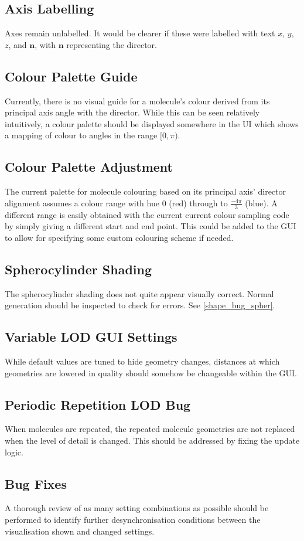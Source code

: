 \subsection{Axis Labelling}
Axes remain unlabelled. It would be clearer if these were labelled with text $x$, $y$, $z$, and $\mathbf{n}$, with $\mathbf{n}$ representing the director.

\subsection{Colour Palette Guide}
Currently, there is no visual guide for a molecule's colour derived from its principal axis angle with the director. While this can be seen relatively intuitively, a colour palette should be displayed somewhere in the UI which shows a mapping of colour to angles in the range $[0, \pi)$.

\subsection{Colour Palette Adjustment}
The current palette for molecule colouring based on its principal axis' director alignment assumes a colour range with hue $0$ (red) through to $\frac{-4\pi}{3}$ (blue). A different range is easily obtained with the current current colour sampling code by simply giving a different start and end point. This could be added to the GUI to allow for specifying some custom colouring scheme if needed.

\subsection{Spherocylinder Shading}
The spherocylinder shading does not quite appear visually correct. Normal generation should be inspected to check for errors. See \cref{shape_bug_spher}.

\subsection{Variable LOD GUI Settings}
While default values are tuned to hide geometry changes, distances at which geometries are lowered in quality should somehow be changeable within the GUI.

\subsection{Periodic Repetition LOD Bug}
When molecules are repeated, the repeated molecule geometries are not replaced when the level of detail is changed. This should be addressed by fixing the update logic.

\subsection{Bug Fixes}
A thorough review of as many setting combinations as possible should be performed to identify further desynchronisation conditions between the visualisation shown and changed settings.
